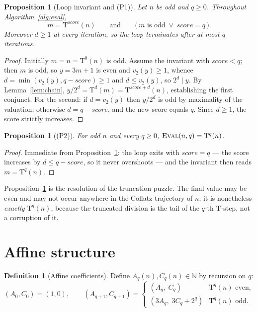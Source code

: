 \documentclass[11pt,a4paper]{article}
\theoremstyle{plain}
\newtheorem{proposition}[theorem]{Proposition}
\theoremstyle{definition}
\newtheorem{definition}[theorem]{Definition}
\newcommand{\N}{\mathbb{N}}
\newcommand{\Tmap}{\mathrm{T}}
\newcommand{\vtwo}{v_2}
\newcommand{\Acoef}{A}
\newcommand{\Ccoef}{C}
\newcommand{\alg}[1]{\textnormal{\textsc{#1}}}
\begin{document}
\begin{proposition}[Loop invariant and (P1)]\label{prop:inv}
Let $n$ be odd and $q \geq 0$. Throughout Algorithm~\ref{alg:eval},
\[
  m = \Tmap^{\mathit{score}}(n)
  \qquad\text{and}\qquad
  \bigl(\, m \text{ is odd} \;\lor\; \mathit{score} = q \,\bigr).
\]
Moreover $d \geq 1$ at every iteration, so the loop terminates after at most
$q$ iterations.
\end{proposition}

\begin{proof}
Initially $m = n = \Tmap^{0}(n)$ is odd. Assume the invariant with
$\mathit{score} < q$; then $m$ is odd, so $y = 3m+1$ is even and
$\vtwo(y) \geq 1$, whence $d = \min(\vtwo(y), q - \mathit{score}) \geq 1$ and
$d \leq \vtwo(y)$, so $2^{d} \mid y$. By Lemma~\ref{lem:chain},
$y/2^{d} = \Tmap^{d}(m) = \Tmap^{\mathit{score}+d}(n)$, establishing the first
conjunct. For the second: if $d = \vtwo(y)$ then $y/2^{d}$ is odd by
maximality of the valuation; otherwise $d = q - \mathit{score}$, and the new
score equals $q$. Since $d \geq 1$, the score strictly increases.
\end{proof}

\begin{proposition}[(P2)]\label{prop:eval}
For odd $n$ and every $q \geq 0$, $\alg{Eval}(n,q) = \Tmap^{q}(n)$.
\end{proposition}

\begin{proof}
Immediate from Proposition~\ref{prop:inv}: the loop exits with
$\mathit{score} = q$ --- the score increases by $d \leq q - \mathit{score}$, so
it never overshoots --- and the invariant then reads $m = \Tmap^{q}(n)$.
\end{proof}

Proposition~\ref{prop:eval} is the resolution of the truncation puzzle. The
final value may be even and may not occur anywhere in the Collatz trajectory
of $n$; it is nonetheless \emph{exactly} $\Tmap^{q}(n)$, because the
truncated division is the tail of the $q$-th $\Tmap$-step, not a corruption of
it.

\section{Affine structure}
\label{sec:affine}

\begin{definition}[Affine coefficients]\label{def:ac}
Define $\Acoef_{q}(n), \Ccoef_{q}(n) \in \N$ by recursion on $q$:
\[
  (\Acoef_{0}, \Ccoef_{0}) = (1, 0), \qquad
  (\Acoef_{q+1}, \Ccoef_{q+1}) =
  \begin{cases}
    (\Acoef_{q},\; \Ccoef_{q})
      & \Tmap^{q}(n) \text{ even},\\[1mm]
    (3\Acoef_{q},\; 3\Ccoef_{q} + 2^{q})
      & \Tmap^{q}(n) \text{ odd}.
  \end{cases}
\]
\end{definition}
\end{document}
